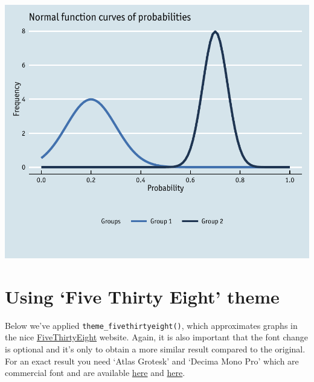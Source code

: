 \begin{Shaded}
\begin{Highlighting}[]
\StringTok{  }\NormalTok{(} \NormalTok{(}\NormalTok{, } \NormalTok{),}
     \NormalTok{(} \NormalTok{),}
    \NormalTok{, }
    \NormalTok{,}
     \NormalTok{, }
     \NormalTok{(} \NormalTok{),}
     \NormalTok{(} \NormalTok{),}
     \NormalTok{(}\NormalTok{))}
\end{Highlighting}
\end{Shaded}

\begin{center}\includegraphics[width=0.6\linewidth]{9_Function_Plots_pdf/function_15-1} \end{center}

\section{\texorpdfstring{Using `Five Thirty Eight'
theme}{Using Five Thirty Eight theme}}\label{using-five-thirty-eight-theme}

Below we've applied \texttt{theme\_fivethirtyeight()}, which
approximates graphs in the nice
\href{http://fivethirtyeight.com/}{FiveThirtyEight} website. Again, it
is also important that the font change is optional and it's only to
obtain a more similar result compared to the original. For an exact
result you need `Atlas Grotesk' and `Decima Mono Pro' which are
commercial font and are available
\href{https://commercialtype.com/catalog/atlas}{here} and
\href{https://www.myfonts.com/fonts/tipografiaramis/decima-mono-pro/}{here}.

